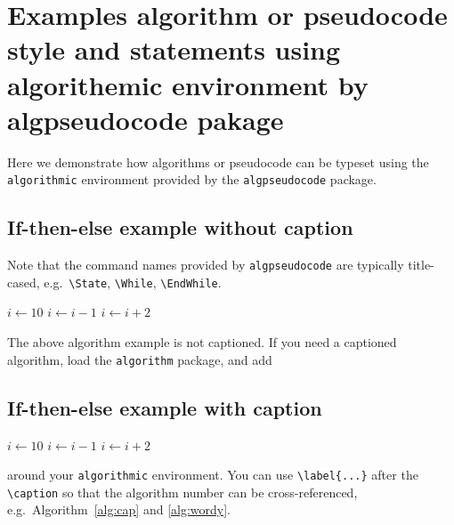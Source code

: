 \documentclass[11pt]{article}
\begin{document}
  
\section{Examples algorithm or pseudocode style and statements using algorithemic environment by algpseudocode pakage}

\listofalgorithms

Here we demonstrate how algorithms or pseudocode can be typeset using the \verb|algorithmic| environment provided by the \verb|algpseudocode| package.



\subsection{ If-then-else example without caption}

Note that the command names provided by \verb|algpseudocode| are typically title-cased, e.g.~\verb|\State|, \verb|\While|, \verb|\EndWhile|.

 
\begin{algorithmic}
\State $i \gets 10$
    \State $i \gets i-1$
\Else
        \State $i \gets i+2$
    \EndIf
\EndIf 
\end{algorithmic}

The above algorithm example is not captioned. If you need a captioned algorithm, load the \verb|algorithm| package, and add 
\subsection{ If-then-else example with caption}

\begin{algorithm}
\caption{An algorithm with caption}\label{alg:cap}
\begin{algorithmic}
\State $i \gets 10$
    \State $i \gets i-1$
\Else
        \State $i \gets i+2$
    \EndIf
\EndIf 
\end{algorithmic}
\end{algorithm}

around your \verb|algorithmic| environment. You can use \verb|\label{...}| after the \verb|\caption| so that the algorithm number can be cross-referenced, e.g.~Algorithm~\ref{alg:cap} and \ref{alg:wordy}.
\end{document}
